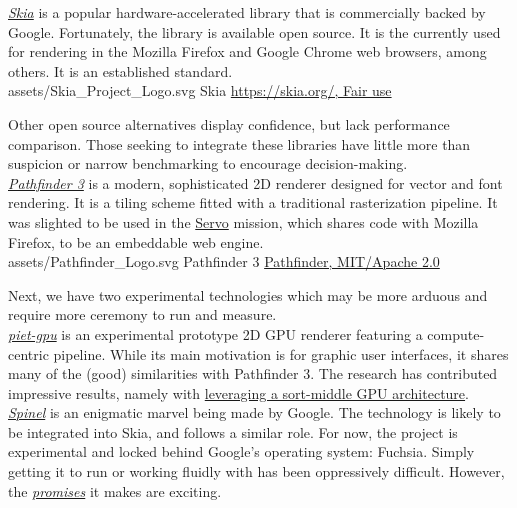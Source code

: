\href{https://skia.org}{\textit{Skia}} is a popular hardware-accelerated library that is commercially backed by Google. Fortunately, the library is available open source. It is the currently used for rendering in the Mozilla Firefox and Google Chrome web browsers, among others. It is an established standard.\\

\smallsvg
{assets/Skia_Project_Logo.svg}
{Skia}
{\href{https://skia.org}{https://skia.org/, Fair use}}

Other open source alternatives display confidence, but lack performance comparison. Those seeking to integrate these libraries have little more than suspicion or narrow benchmarking to encourage decision-making.\\

\href{https://github.com/servo/pathfinder}{\textit{Pathfinder 3}} is a modern, sophisticated 2D renderer designed for vector and font rendering. It is a tiling scheme fitted with a traditional rasterization pipeline. It was slighted to be used in the \href{https://servo.org/}{Servo} mission, which shares code with Mozilla Firefox, to be an embeddable web engine.\\

\smallsvg
{assets/Pathfinder_Logo.svg}
{Pathfinder 3}
{\href{https://github.com/servo/pathfinder}{Pathfinder, MIT/Apache 2.0}}

Next, we have two experimental technologies which may be more arduous and require more ceremony to run and measure.\\

\href{https://github.com/linebender/piet-gpu}{\textit{piet-gpu}} is an experimental prototype 2D GPU renderer featuring a compute-centric pipeline. While its main motivation is for graphic user interfaces, it shares many of the (good) similarities with Pathfinder 3. The research has contributed impressive results, namely with \href{https://raphlinus.github.io/rust/graphics/gpu/2020/06/12/sort-middle.html}{leveraging a sort-middle GPU architecture}.\\

\href{https://fuchsia.googlesource.com/fuchsia/+/refs/heads/main/src/graphics/lib/compute/spinel/README.md}{\textit{Spinel}} is an enigmatic marvel being made by Google. The technology is likely to be integrated into Skia, and follows a similar role. For now, the project is experimental and locked behind Google's operating system: Fuchsia. Simply getting it to run or working fluidly with has been oppressively difficult. However, the \href{https://fuchsia.googlesource.com/fuchsia/+/refs/heads/main/src/graphics/lib/compute/spinel/README.md}{\emph{promises}} it makes are exciting.

